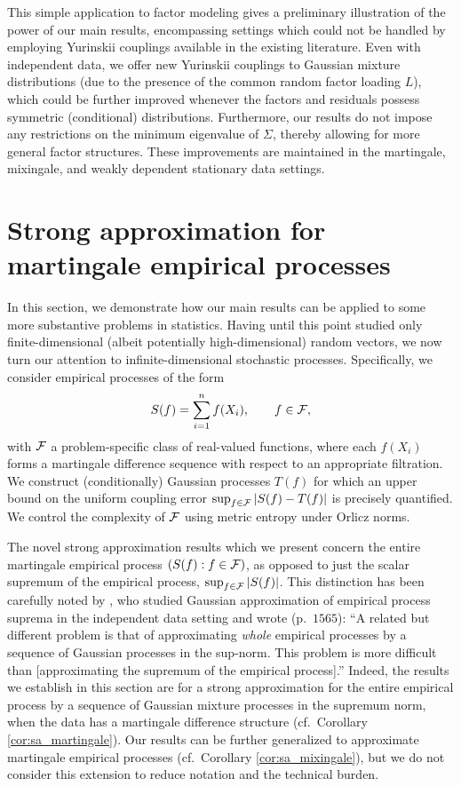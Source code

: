 This simple application to factor modeling gives a preliminary illustration of
the power of our main results, encompassing settings which could not be handled
by employing Yurinskii couplings available in the existing literature. Even
with independent data, we offer new Yurinskii couplings to Gaussian mixture
distributions (due to the presence of the common random factor loading $L$),
which could be further improved whenever the factors and residuals possess
symmetric (conditional) distributions. Furthermore, our results do not impose
any restrictions on the minimum eigenvalue of $\Sigma$, thereby allowing for
more general factor structures. These improvements are maintained in the
martingale, mixingale, and weakly dependent stationary data settings.

\section{Strong approximation for martingale empirical processes}%
\label{sec:emp_proc}

In this section, we demonstrate how our main results can be applied to some more
substantive problems in statistics. Having until this point studied only
finite-dimensional (albeit potentially high-dimensional) random vectors, we now
turn our attention to infinite-dimensional stochastic processes. Specifically,
we consider empirical processes of the form \[S(f) = \sum_{i=1}^{n} f(X_i),
  \qquad f \in \mathcal{F},\] with $\mathcal{F}$ a problem-specific class of real-valued
functions, where each $f(X_i)$ forms a martingale difference sequence with
respect to an appropriate filtration. We construct (conditionally) Gaussian
processes $T(f)$ for which an upper bound on the uniform coupling error
$\sup_{f \in \mathcal{F}} |S(f) - T(f)|$ is precisely quantified. We control the
complexity of $\mathcal{F}$ using metric entropy under Orlicz norms.

The novel strong approximation results which we present concern the entire
martingale empirical process $(S(f):f \in \mathcal{F})$, as opposed to just the scalar
supremum of the empirical process, $\sup_{f \in \mathcal{F}} |S(f)|$. This distinction
has been carefully noted by \citet{chernozhukov2014gaussian}, who studied
Gaussian approximation of empirical process suprema in the independent data
setting and wrote (p.\ $1565$): ``A related but different problem is that of
approximating \textit{whole} empirical processes by a sequence of Gaussian
processes in the sup-norm. This problem is more difficult than
  [approximating the supremum of the empirical process].''
Indeed, the results we establish in
this section are for a strong approximation for the entire empirical process by
a sequence of Gaussian mixture processes in the supremum norm, when the data
has a martingale difference structure (cf.\ Corollary \ref{cor:sa_martingale}).
Our results can be further generalized to approximate martingale
empirical processes (cf.\ Corollary \ref{cor:sa_mixingale}), but we do not
consider this extension to reduce notation and the technical burden.

